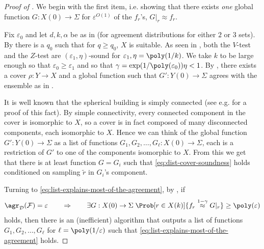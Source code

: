 \begin{proof}[Proof of ]
We begin with the first item, i.e. showing that there exists \emph{one} global function \(G:X(0) \to \Sigma\) for \(\varepsilon^{O(1)}\) of the \(f_r\)'s, \(G|_r \approx f_r\).

Fix \(\varepsilon_0\) and let \(d,k,\alpha\) be as in  (for agreement distributions for either \(2\) or \(3\) sets). By  there is a \(q_0\) such that for \(q \geq q_0\), \(X\) is suitable. As seen in , both the \(V\)-test and the \(Z\)-test are \((\varepsilon_1,\eta)\)-sound for \(\varepsilon_1, \eta = \poly(1/k)\). We take \(k\) to be large enough so that \(\varepsilon_0 \geq \varepsilon_1\) and so that \(\gamma = \exp(1/\poly(\varepsilon_0))\eta < 1\). By , there exists a cover \(\rho:Y \to X\) and a global function such that \(G':Y(0) \to \Sigma\) agrees with the ensemble as in .

It is well known that the spherical building is simply connected (see e.g. \cite{DiksteinD2023} for a proof of this fact). By simple connectivity, every connected component in the cover is isomorphic to \(X\), so a cover is in fact composed of many disconnected components, each isomorphic to \(X\). Hence we can think of the global function \(G':Y(0) \to \Sigma\) as a list of functions \(G_1,G_2,\dots,G_\ell:X(0) \to \Sigma\), each is a restriction of \(G'\) to one of the components isomorphic to \(X\). From this we get that there is at least function \(G=G_i\) such that \eqref{eq:dist-cover-soundness} holds conditioned on sampling \(\tilde{r}\) in \(G_i\)'s component.

\medskip

Turning to \eqref{eq:list-explains-most-of-the-agreement}, by \cite[Theorem 5.1]{DinurG2008}, if
\[\agr_{\mathcal{D}}(\mathcal{F}) = \varepsilon \qquad \Rightarrow \qquad \exists G:X(0) \to \Sigma \; \Prob[r \in X(k)]{f_r \overset{1-\gamma}{\approx} G|_r} \geq \poly(\varepsilon)\]
holds, then there is an (inefficient) algorithm that outputs a list of functions \(G_1,G_2,\dots,G_\ell\) for \(\ell = \poly(1/\varepsilon)\) such that \eqref{eq:list-explains-most-of-the-agreement} holds. 
\end{proof}

